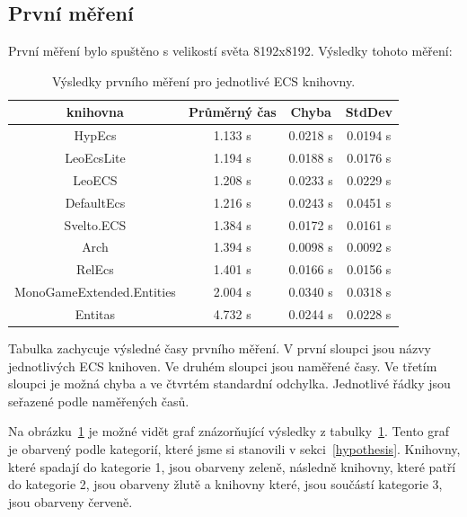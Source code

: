 \subsection{První měření}
První měření bylo spuštěno s velikostí světa 8192x8192. Výsledky tohoto měření:

\begin{table}[!htb]
    \centering\footnotesize\sf
    \begin{tabular}{c c c c}
        \toprule
        knihovna & Průměrný čas & Chyba & StdDev \\
        \midrule
        HypEcs & 1.133 s & 0.0218 s & 0.0194 s \\
        LeoEcsLite & 1.194 s & 0.0188 s & 0.0176 s \\
        LeoECS & 1.208 s & 0.0233 s & 0.0229 s \\
        DefaultEcs & 1.216 s & 0.0243 s & 0.0451 s \\
        Svelto.ECS & 1.384 s & 0.0172 s & 0.0161 s \\
        Arch & 1.394 s & 0.0098 s & 0.0092 s \\
        RelEcs & 1.401 s & 0.0166 s & 0.0156 s \\
        MonoGameExtended.Entities & 2.004 s & 0.0340 s & 0.0318 s \\
        Entitas & 4.732 s & 0.0244 s & 0.0228 s \\
        \bottomrule
    \end{tabular}
    \caption{Výsledky prvního měření pro jednotlivé ECS knihovny.}
    \label{tab:first-benchmark-results}
\end{table}

Tabulka zachycuje výsledné časy prvního měření. V první sloupci jsou názvy jednotlivých ECS knihoven. Ve druhém sloupci jsou naměřené časy. Ve třetím sloupci je možná chyba a ve čtvrtém standardní odchylka. Jednotlivé řádky jsou seřazené podle naměřených časů.

Na obrázku~\ref{tab:first-benchmark-results} je možné vidět graf znázorňující výsledky z tabulky~\ref{tab:first-benchmark-results}. Tento graf je obarvený podle kategorií, které jsme si stanovili v sekci~\ref{hypothesis}. Knihovny, které spadají do kategorie 1, jsou obarveny zeleně, následně knihovny, které patří do kategorie 2, jsou obarveny žlutě a knihovny které, jsou součástí kategorie 3, jsou obarveny červeně.

